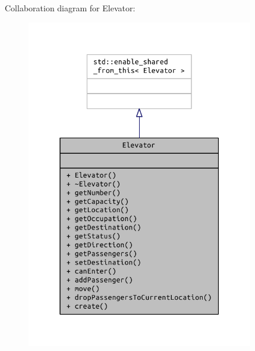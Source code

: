 Collaboration diagram for Elevator\+:
\nopagebreak
\begin{figure}[H]
\begin{center}
\leavevmode
\includegraphics[width=280pt]{class_elevator__coll__graph}
\end{center}
\end{figure}
